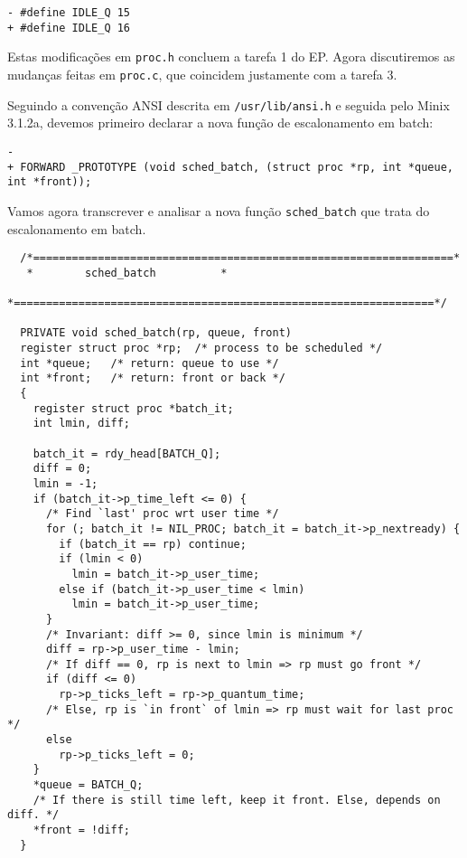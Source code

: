 \documentclass{amsart}
\theoremstyle{plain}
\newcommand{\code}[1]{\lstinline[mathescape=true]{#1}}
\begin{document}
\begin{lstlisting}[frame=leftline,mathescape=true,style=nonumbers]
- #define IDLE_Q 15
+ #define IDLE_Q 16
\end{lstlisting}

Estas modificações em \code{proc.h} concluem a tarefa 1 do EP\@. Agora discutiremos as mudanças
feitas em \code{proc.c}, que coincidem justamente com a tarefa 3.

Seguindo a convenção ANSI descrita em \code{/usr/lib/ansi.h} e seguida pelo Minix 3.1.2a, devemos
primeiro declarar a nova função de escalonamento em batch:

\begin{lstlisting}[frame=leftline,mathescape=true,style=nonumbers]
-
+ FORWARD _PROTOTYPE (void sched_batch, (struct proc *rp, int *queue, int *front));
\end{lstlisting}

Vamos agora transcrever e analisar a nova função \code{sched_batch} que trata do escalonamento em
batch.
\newpage

\begin{verbatim}
  /*=================================================================*
   *        sched_batch          *
   *=================================================================*/

  PRIVATE void sched_batch(rp, queue, front)
  register struct proc *rp;  /* process to be scheduled */
  int *queue;   /* return: queue to use */
  int *front;   /* return: front or back */
  {
    register struct proc *batch_it;
    int lmin, diff;

    batch_it = rdy_head[BATCH_Q];
    diff = 0;
    lmin = -1;
    if (batch_it->p_time_left <= 0) {
      /* Find `last' proc wrt user time */
      for (; batch_it != NIL_PROC; batch_it = batch_it->p_nextready) {
        if (batch_it == rp) continue;
        if (lmin < 0)
          lmin = batch_it->p_user_time;
        else if (batch_it->p_user_time < lmin)
          lmin = batch_it->p_user_time;
      }
      /* Invariant: diff >= 0, since lmin is minimum */
      diff = rp->p_user_time - lmin;
      /* If diff == 0, rp is next to lmin => rp must go front */
      if (diff <= 0)
        rp->p_ticks_left = rp->p_quantum_time;
      /* Else, rp is `in front` of lmin => rp must wait for last proc */
      else
        rp->p_ticks_left = 0;
    }
    *queue = BATCH_Q;
    /* If there is still time left, keep it front. Else, depends on diff. */
    *front = !diff;
  }
\end{verbatim}
\end{document}
